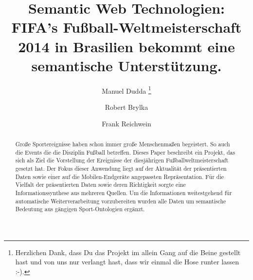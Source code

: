 \documentclass[runningheads,a4paper]{llncs}
\begin{document}
\mainmatter  %

\title{Semantic Web Technologien:\\FIFA's Fu\ss ball-Weltmeisterschaft 2014 in Brasilien bekommt eine semantische Unterst\"utzung.}


%
%
\author{Manuel Dudda%
\thanks{Herzlichen Dank, dass Du das Projekt im allein Gang auf die Beine gestellt hast und von uns nur verlangt hast, dass wir einmal die Hose runter lassen :-).}%
\and Robert Brylka\and Frank Reichwein}
%


%
%

\maketitle


\begin{abstract}
Große Sportereignisse haben schon immer große Menschenmaßen begeistert. So auch die Events die die Disziplin Fußball betreffen. Dieses Paper beschreibt ein Projekt, das sich als Ziel die Vorstellung der Ereignisse der diesjährigen Fußballweltmeisterschaft gesetzt hat. Der Fokus dieser Anwendung liegt auf der Aktualität der präsentierten Daten sowie einer auf die Mobilen-Endgeräte angepassten Repräsentation. Für die Vielfalt der präsentierten Daten sowie deren Richtigkeit sorgte eine Informationssynthese aus mehreren Quellen. Um die Informationen weitestgehend für automatische Weiterverarbeitung vorzubereiten wurden alle Daten um semantische Bedeutung aus gängigen Sport-Ontologien ergänzt.
\end{abstract}
\end{document}
